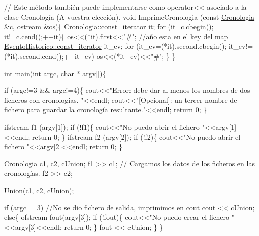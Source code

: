\begin{DoxyCodeInclude}
\textcolor{comment}{// Este método también puede implementarse como operator<< asociado a la clase Cronología (A vuestra
       elección).}
\textcolor{keywordtype}{void} ImprimeCronologia (\textcolor{keyword}{const} \hyperlink{classCronologia}{Cronologia} &c, ostream &os)\{
   \hyperlink{classCronologia_1_1const__iterator}{Cronologia::const\_iterator} it;
   \textcolor{keywordflow}{for} (it=c.\hyperlink{classCronologia_a7457f94493f66fdd906f9c2cae44732b}{cbegin}(); it!=c.\hyperlink{classCronologia_afc9925e321be957f47312184af813d09}{cend}();++it)\{
       os<<(*it).first<<\textcolor{stringliteral}{"#"};          \textcolor{comment}{//año esta en el key del map}
       \hyperlink{classEventoHistorico_1_1const__iterator}{EventoHistorico::const\_iterator} it\_ev;
       \textcolor{keywordflow}{for} (it\_ev=(*it).second.cbegin(); it\_ev!=(*it).second.cend();++it\_ev)
        os<<(*it\_ev)<<\textcolor{stringliteral}{"#"};
   \}
\}

\textcolor{keywordtype}{int} main(\textcolor{keywordtype}{int} argc, \textcolor{keywordtype}{char} * argv[])\{

  \textcolor{keywordflow}{if} (argc!=3 && argc!=4)\{
      cout<<\textcolor{stringliteral}{"Error: debe dar al menos los nombres de dos ficheros con cronologías. "}<<endl;
      cout<<\textcolor{stringliteral}{"[Opcional]: un tercer nombre de fichero para guardar la cronología resultante."}<<endl;
      \textcolor{keywordflow}{return} 0;
   \}

   ifstream f1 (argv[1]);
   \textcolor{keywordflow}{if} (!f1)\{
    cout<<\textcolor{stringliteral}{"No puedo abrir el fichero "}<<argv[1]<<endl;
    \textcolor{keywordflow}{return} 0;
   \}
   ifstream f2 (argv[2]);
   \textcolor{keywordflow}{if} (!f2)\{
    cout<<\textcolor{stringliteral}{"No puedo abrir el fichero "}<<argv[2]<<endl;
    \textcolor{keywordflow}{return} 0;
   \}

   \hyperlink{classCronologia}{Cronologia} c1, c2, cUnion;
   f1 >> c1;    \textcolor{comment}{// Cargamos los datos de los ficheros en las cronologías.}
   f2 >> c2;

   Union(c1, c2, cUnion);

   \textcolor{keywordflow}{if} (argc==3)   \textcolor{comment}{//No se dio fichero de salida, imprimimos en cout}
      cout << cUnion;
   \textcolor{keywordflow}{else}\{
     ofstream fout(argv[3]);
     \textcolor{keywordflow}{if} (!fout)\{
      cout<<\textcolor{stringliteral}{"No puedo crear el fichero "}<<argv[3]<<endl;
      \textcolor{keywordflow}{return} 0;
     \}
    fout << cUnion;
   \}
\}
\end{DoxyCodeInclude}
